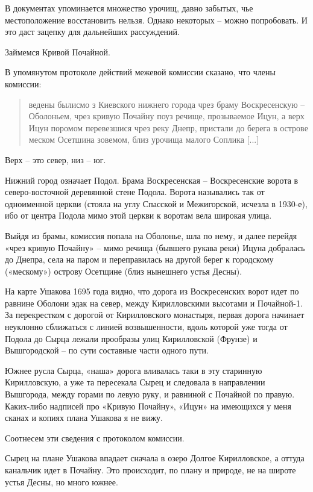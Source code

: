 В документах упоминается множество урочищ, давно забытых, чье местоположение восстановить нельзя. Однако некоторых – можно попробовать. И это даст зацепку для дальнейших рассуждений.

Займемся Кривой Почайной.

В упомянутом протоколе действий межевой комиссии сказано, что члены комиссии:

\begin{quotation}
ведены былисмо з Киевского нижнего города чрез браму Воскресенскую – Оболоньем, чрез кривую Почайну поуз речище, прозываемое Ицун, а верх Ицун поромом перевезшися чрез реку Днепр, пристали до берега в острове меском Осетшина зовемом, близ урочища малого Соплика [...]
\end{quotation}

Верх – это север, низ – юг.

Нижний город означает Подол. Брама Воскресенская – Воскресенские ворота в северо-восточной деревянной стене Подола. Ворота назывались так от одноименной церкви (стояла на углу Спасской и Межигорской, исчезла в 1930-е), ибо от центра Подола мимо этой церкви к воротам вела широкая улица.

Выйдя из брамы, комиссия попала на Оболонье, шла по нему, и далее перейдя «чрез кривую Почайну» –  мимо речища (бывшего рукава реки) Ицуна добралась до Днепра, села на паром и переправилась на другой берег к городскому («мескому») острову Осетщине (близ нынешнего устья Десны).

На карте Ушакова 1695 года видно, что дорога из Воскресенских ворот идет по равнине Оболони эдак на север, между Кирилловскими высотами и Почайной-1. За перекрестком с дорогой от Кирилловского монастыря, первая дорога начинает неуклонно сближаться с линией возвышенности, вдоль которой уже тогда от Подола до Сырца лежали прообразы улиц Кирилловской (Фрунзе) и Вышгородской – по сути составные части одного пути. 

Южнее русла Сырца, «наша» дорога вливалась таки в эту старинную Кирилловскую, а уже та пересекала Сырец и следовала в направлении Вышгорода, между горами по левую руку, и равниной с Почайной по правую. Каких-либо надписей про «Кривую Почайну», «Ицун» на имеющихся у меня сканах и копиях плана Ушакова я не вижу.

Соотнесем эти сведения с протоколом комиссии. 

Сырец на плане Ушакова впадает сначала в озеро Долгое Кирилловское, а оттуда канальчик идет в Почайну.  Это происходит, по плану и природе, не на широте устья Десны, но много южнее.

